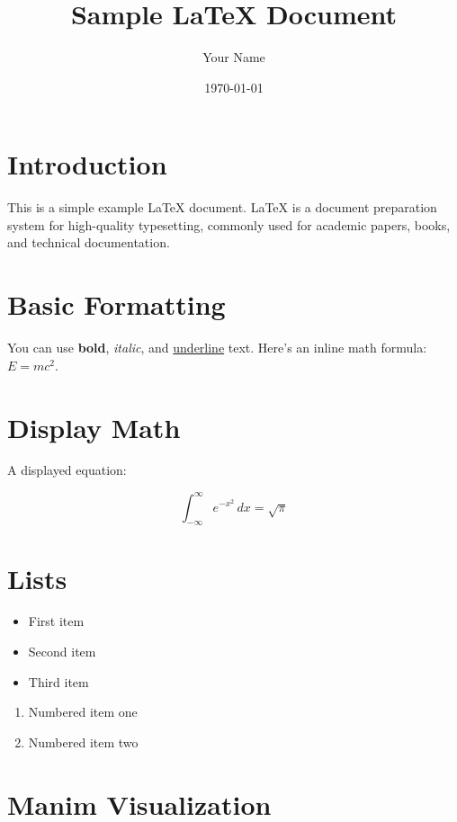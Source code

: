 \documentclass[11pt]{article}
\title{Sample LaTeX Document}
\author{Your Name}
\date{\today}
\begin{document}
\maketitle

\section{Introduction}

This is a simple example LaTeX document. LaTeX is a document preparation system for high-quality typesetting, commonly used for academic papers, books, and technical documentation.

\section{Basic Formatting}

You can use \textbf{bold}, \textit{italic}, and \underline{underline} text. Here's an inline math formula: $E = mc^2$.

\section{Display Math}

A displayed equation:

\begin{equation}
    \int_{-\infty}^{\infty} e^{-x^2} \, dx = \sqrt{\pi}
\end{equation}

\section{Lists}

\begin{itemize}
    \item First item
    \item Second item
    \item Third item
\end{itemize}

\begin{enumerate}
    \item Numbered item one
    \item Numbered item two
\end{enumerate}

\section{Manim Visualization}
\end{document}
